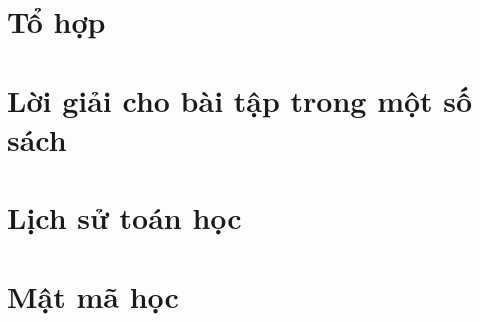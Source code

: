 \documentclass[oneside]{book}
\begin{document}
\part{Tổ hợp}


\part{Lời giải cho bài tập trong một số sách}




\part{Lịch sử toán học}


\part{Mật mã học}





\medskip


\end{document}
